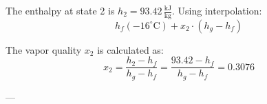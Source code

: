 The enthalpy at state 2 is \( h_2 = 93.42 \, \frac{\text{kJ}}{\text{kg}} \). Using interpolation:  
\[
h_f(-16^\circ\text{C}) + x_2 \cdot (h_g - h_f)
\]  

The vapor quality \( x_2 \) is calculated as:  
\[
x_2 = \frac{h_2 - h_f}{h_g - h_f} = \frac{93.42 - h_f}{h_g - h_f} = 0.3076
\]  

---